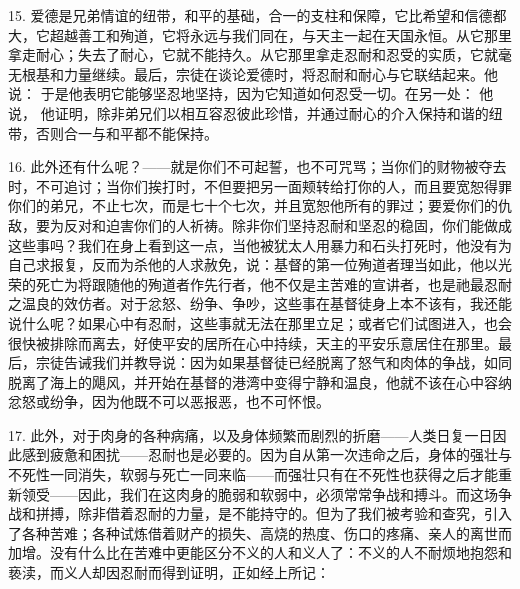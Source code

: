 15. 爱德是兄弟情谊的纽带，和平的基础，合一的支柱和保障，它比希望和信德都大，它超越善工和殉道，它将永远与我们同在，与天主一起在天国永恒。从它那里拿走耐心；失去了耐心，它就不能持久。从它那里拿走忍耐和忍受的实质，它就毫无根基和力量继续。最后，宗徒在谈论爱德时，将忍耐和耐心与它联结起来。他说：  于是他表明它能够坚忍地坚持，因为它知道如何忍受一切。在另一处： 他说，  他证明，除非弟兄们以相互容忍彼此珍惜，并通过耐心的介入保持和谐的纽带，否则合一与和平都不能保持。\par

16. 此外还有什么呢？——就是你们不可起誓，也不可咒骂；当你们的财物被夺去时，不可追讨；当你们挨打时，不但要把另一面颊转给打你的人，而且要宽恕得罪你们的弟兄，不止七次，而是七十个七次，并且宽恕他所有的罪过；要爱你们的仇敌，要为反对和迫害你们的人祈祷。除非你们坚持忍耐和坚忍的稳固，你们能做成这些事吗？我们在身上看到这一点，当他被犹太人用暴力和石头打死时，他没有为自己求报复，反而为杀他的人求赦免，说：基督的第一位殉道者理当如此，他以光荣的死亡为将跟随他的殉道者作先行者，他不仅是主苦难的宣讲者，也是祂最忍耐之温良的效仿者。对于忿怒、纷争、争吵，这些事在基督徒身上本不该有，我还能说什么呢？如果心中有忍耐，这些事就无法在那里立足；或者它们试图进入，也会很快被排除而离去，好使平安的居所在心中持续，天主的平安乐意居住在那里。最后，宗徒告诫我们并教导说：因为如果基督徒已经脱离了怒气和肉体的争战，如同脱离了海上的飓风，并开始在基督的港湾中变得宁静和温良，他就不该在心中容纳忿怒或纷争，因为他既不可以恶报恶，也不可怀恨。\par

17. 此外，对于肉身的各种病痛，以及身体频繁而剧烈的折磨——人类日复一日因此感到疲惫和困扰——忍耐也是必要的。因为自从第一次违命之后，身体的强壮与不死性一同消失，软弱与死亡一同来临——而强壮只有在不死性也获得之后才能重新领受——因此，我们在这肉身的脆弱和软弱中，必须常常争战和搏斗。而这场争战和拼搏，除非借着忍耐的力量，是不能持守的。但为了我们被考验和查究，引入了各种苦难；各种试炼借着财产的损失、高烧的热度、伤口的疼痛、亲人的离世而加增。没有什么比在苦难中更能区分不义的人和义人了：不义的人不耐烦地抱怨和亵渎，而义人却因忍耐而得到证明，正如经上所记：\par


